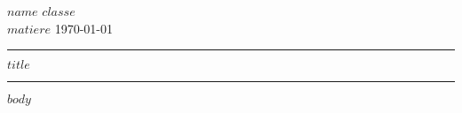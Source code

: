 \documentclass[twoside, 11pt]{article}
\begin{document}
$name$ \hfill $classe$ \\
$matiere$ \hfill \today\\
\hrule
\vspace{0.1cm}
\begin{center}
  \large \textsc{$title$}
\end{center}
\vspace{0.1cm}
\hrule

$body$
\end{document}
